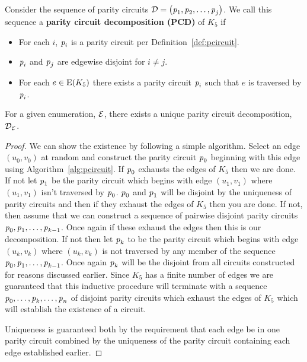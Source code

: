 \begin{definition}
  \label{def:pcd}
Consider the sequence of parity circuits $\operatorname{\mathcal{D}} = \left( \operatorname{\mathit{p}}_1, \operatorname{\mathit{p}}_2, \ldots, \operatorname{\mathit{p}}_j \right)$. We call this sequence a  {\bf parity circuit decomposition (PCD)} of $K_5$ if 
\begin{itemize}
\item For each $i$, $\operatorname{\mathit{p}}_i$ is a parity circuit per Definition~\ref{def:pcircuit}.
\item $\operatorname{\mathit{p}}_i$ and $\operatorname{\mathit{p}}_j$ are edgewise disjoint for $i \neq j$.
\item For each $e \in \mathrm{E}(K_5) $ there exists a parity circuit $\operatorname{\mathit{p}}_i$ such that $e$ is traversed by $\operatorname{\mathit{p}}_i$. 
\end{itemize}
\end{definition}


\begin{theorem}
 \label{thm:unique_pcd}
For a given enumeration, $\operatorname{\mathcal{E}}$,  there exists a unique parity circuit decomposition, $\operatorname{\mathcal{D}}_{\operatorname{\mathcal{E}}}$. 
\end{theorem}

\begin{proof}

We can show the existence by following a simple algorithm. Select an edge $(u_0, v_0 )$ at random and construct the parity circuit $\operatorname{\mathit{p}}_0$ beginning with this edge using Algorithm~\ref{alg:pcircuit}. If $\operatorname{\mathit{p}}_0$ exhausts the edges of $K_5$ then we are done. If not let $\operatorname{\mathit{p}}_{1}$ be the parity circuit which begins with edge $( u_1, v_1 )$  where $(u_1, v_1 )$ isn't traversed by $\operatorname{\mathit{p}}_0$. $\operatorname{\mathit{p}}_0$ and $\operatorname{\mathit{p}}_1$ will be disjoint by the uniqueness of parity circuits and then if they exhaust the edges of $K_5$ then you are done. If not, then assume that we can construct a sequence of pairwise disjoint parity circuits $\operatorname{\mathit{p}}_0, \operatorname{\mathit{p}}_1, \ldots, \operatorname{\mathit{p}}_{k-1}$. Once again if these exhaust the edges then this is our decomposition. If not then let $\operatorname{\mathit{p}}_k$ to be the parity circuit which begins with edge $\left( u_k, v_k \right)$ where $\left( u_k , v_k\right)$ is not traversed by any member of the sequence $ \operatorname{\mathit{p}}_0, \operatorname{\mathit{p}}_1, \ldots, \operatorname{\mathit{p}}_{k-1} $. Once again $\operatorname{\mathit{p}}_k$ will be the disjoint from all circuits constructed for reasons discussed earlier. Since $K_5$ has a finite number of edges we are guaranteed that this inductive procedure will terminate with a sequence $\operatorname{\mathit{p}}_0, \ldots, \operatorname{\mathit{p}}_k, \ldots, \operatorname{\mathit{p}}_n$ of disjoint parity circuits which exhaust the edges of $K_5$ which will establish the existence of a circuit.

Uniqueness is guaranteed both by the requirement that each edge be in one parity circuit combined by the uniqueness of the parity circuit containing each edge established earlier. 
\end{proof}

